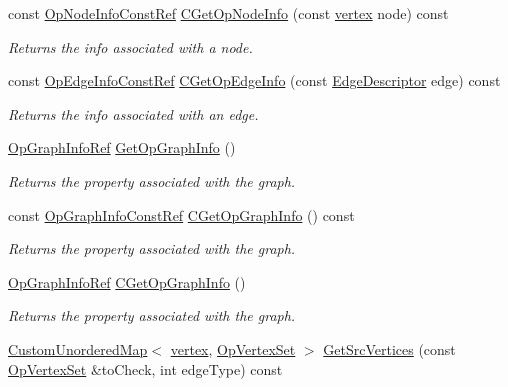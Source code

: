 \begin{DoxyCompactItemize}
const \hyperlink{op__graph_8hpp_a9e7b5806b7d7ea87cc4abe68bf204684}{Op\+Node\+Info\+Const\+Ref} \hyperlink{structOpGraph_a8743b659d48a1922e75397b47c97bd5c}{C\+Get\+Op\+Node\+Info} (const \hyperlink{graph_8hpp_abefdcf0544e601805af44eca032cca14}{vertex} node) const
\begin{DoxyCompactList}\small\item\em Returns the info associated with a node. \end{DoxyCompactList}\item 
const \hyperlink{op__graph_8hpp_ad56e1eade1e36cb8d170845855e19adc}{Op\+Edge\+Info\+Const\+Ref} \hyperlink{structOpGraph_ad029d85b1174dc53da7add156c68c30a}{C\+Get\+Op\+Edge\+Info} (const \hyperlink{graph_8hpp_a9eb9afea34e09f484b21f2efd263dd48}{Edge\+Descriptor} edge) const
\begin{DoxyCompactList}\small\item\em Returns the info associated with an edge. \end{DoxyCompactList}\item 
\hyperlink{op__graph_8hpp_aa53452ee6eef48921379dd17cb659724}{Op\+Graph\+Info\+Ref} \hyperlink{structOpGraph_a5a7760a7fafb5e18e25d1211b157c559}{Get\+Op\+Graph\+Info} ()
\begin{DoxyCompactList}\small\item\em Returns the property associated with the graph. \end{DoxyCompactList}\item 
const \hyperlink{op__graph_8hpp_af2fea39867a0ccd19a63845f5213dabc}{Op\+Graph\+Info\+Const\+Ref} \hyperlink{structOpGraph_a3f8d3d26ce28f7663105445996fc8fb8}{C\+Get\+Op\+Graph\+Info} () const
\begin{DoxyCompactList}\small\item\em Returns the property associated with the graph. \end{DoxyCompactList}\item 
\hyperlink{op__graph_8hpp_aa53452ee6eef48921379dd17cb659724}{Op\+Graph\+Info\+Ref} \hyperlink{structOpGraph_ad3c791977bb1c328a3c24cdfecc2d415}{C\+Get\+Op\+Graph\+Info} ()
\begin{DoxyCompactList}\small\item\em Returns the property associated with the graph. \end{DoxyCompactList}\item 
\hyperlink{custom__map_8hpp_ad1ed68f2ff093683ab1a33522b144adc}{Custom\+Unordered\+Map}$<$ \hyperlink{graph_8hpp_abefdcf0544e601805af44eca032cca14}{vertex}, \hyperlink{classOpVertexSet}{Op\+Vertex\+Set} $>$ \hyperlink{structOpGraph_aef07453090deb05f3b216ac159043b07}{Get\+Src\+Vertices} (const \hyperlink{classOpVertexSet}{Op\+Vertex\+Set} \&to\+Check, int edge\+Type) const

\end{DoxyCompactItemize}
